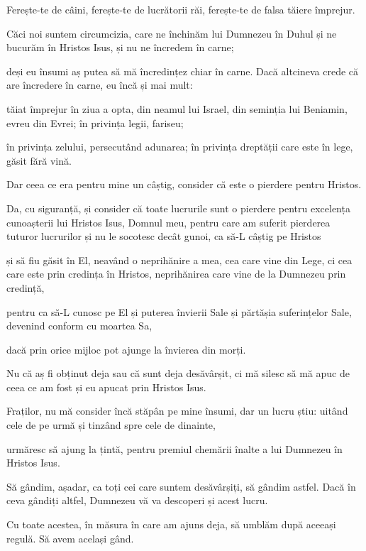 {\par }{\PP {}Ferește-te de câini, ferește-te de lucrătorii răi, ferește-te de falsa tăiere împrejur.

Căci noi suntem circumcizia, care ne închinăm lui Dumnezeu în Duhul și ne bucurăm în Hristos Isus, și nu ne încredem în carne;

deși eu însumi aș putea să mă încredințez chiar în carne. Dacă altcineva crede că are încredere în carne, eu încă și mai mult:

tăiat împrejur în ziua a opta, din neamul lui Israel, din seminția lui Beniamin, evreu din Evrei; în privința legii, fariseu;

în privința zelului, persecutând adunarea; în privința dreptății care este în lege, găsit fără vină.


\par }{\PP {}Dar ceea ce era pentru mine un câștig, consider că este o pierdere pentru Hristos.

Da, cu siguranță, și consider că toate lucrurile sunt o pierdere pentru excelența cunoașterii lui Hristos Isus, Domnul meu, pentru care am suferit pierderea tuturor lucrurilor și nu le socotesc decât gunoi, ca să-L câștig pe Hristos

și să fiu găsit în El, neavând o neprihănire a mea, cea care vine din Lege, ci cea care este prin credința în Hristos, neprihănirea care vine de la Dumnezeu prin credință,

pentru ca să-L cunosc pe El și puterea învierii Sale și părtășia suferințelor Sale, devenind conform cu moartea Sa,

dacă prin orice mijloc pot ajunge la învierea din morți.

Nu că aș fi obținut deja sau că sunt deja desăvârșit, ci mă silesc să mă apuc de ceea ce am fost și eu apucat prin Hristos Isus.


\par }{\PP {}Fraților, nu mă consider încă stăpân pe mine însumi, dar un lucru știu: uitând cele de pe urmă și tinzând spre cele de dinainte,

urmăresc să ajung la țintă, pentru premiul chemării înalte a lui Dumnezeu în Hristos Isus.

Să gândim, așadar, ca toți cei care suntem desăvârșiți, să gândim astfel. Dacă în ceva gândiți altfel, Dumnezeu vă va descoperi și acest lucru.

Cu toate acestea, în măsura în care am ajuns deja, să umblăm după aceeași regulă. Să avem același gând.


}
